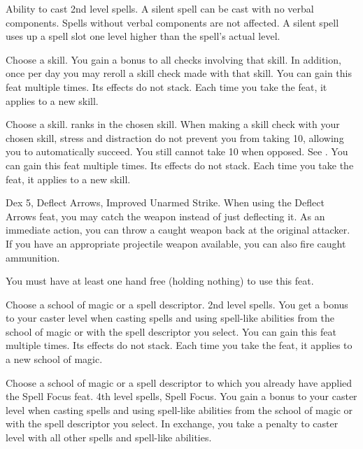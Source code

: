 Ability to cast 2nd level spells.
 A silent spell can be cast with no verbal components. Spells without verbal components are not affected. A silent spell uses up a spell slot one level higher than the spell's actual level.

Choose a skill.
 You gain a  bonus to all checks involving that skill. In addition, once per day you may reroll a skill check made with that skill.
 You can gain this feat multiple times. Its effects do not stack. Each time you take the feat, it applies to a new skill.

Choose a skill.
 ranks in the chosen skill.
\featben When making a skill check with your chosen skill, stress and distraction do not prevent you from taking 10, allowing you to automatically succeed. You still cannot take 10 when opposed. See .
 You can gain this feat multiple times. Its effects do not stack. Each time you take the feat, it applies to a new skill.

 Dex 5, Deflect Arrows, Improved Unarmed Strike.
 When using the Deflect Arrows feat, you may catch the weapon instead of just deflecting it. As an immediate action, you can throw a caught weapon back at the original attacker. If you have an appropriate projectile weapon available, you can also fire caught ammunition.
\par You must have at least one hand free (holding nothing) to use this feat.

Choose a school of magic or a spell descriptor.
 2nd level spells.
 You get a  bonus to your caster level when casting spells and using spell-like abilities from the school of magic or with the spell descriptor you select.
 You can gain this feat multiple times. Its effects do not stack. Each time you take the feat, it applies to a new school of magic.

Choose a school of magic or a spell descriptor to which you already have applied the Spell Focus feat.
\featpre 4th level spells, Spell Focus.
\featben You gain a  bonus to your caster level when casting spells and using spell-like abilities from the school of magic or with the spell descriptor you select. In exchange, you take a  penalty to caster level with all other spells and spell-like abilities.

